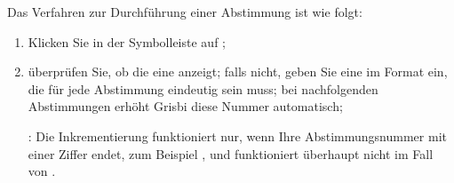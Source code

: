 Das Verfahren zur Durchführung einer Abstimmung ist wie folgt:
\begin{enumerate}
	\item Klicken Sie in der Symbolleiste auf ;
	\item überprüfen Sie, ob die  eine  anzeigt; falls nicht, geben Sie eine im Format  ein, die für jede Abstimmung eindeutig sein muss; bei nachfolgenden Abstimmungen erhöht Grisbi diese Nummer automatisch;
	
	\Note{}: Die Inkrementierung funktioniert nur, wenn Ihre Abstimmungsnummer mit einer Ziffer endet, zum Beispiel , und funktioniert überhaupt nicht im Fall von .
	

\end{enumerate}
